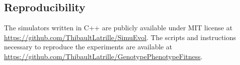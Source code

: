 \documentclass{article}
\begin{document}
\subsection*{Reproducibility}
The simulators written in C++ are publicly available under MIT license at \url{https://github.com/ThibaultLatrille/SimuEvol}.
The scripts and instructions necessary to reproduce the experiments are available at \url{https://github.com/ThibaultLatrille/GenotypePhenotypeFitness}.


\end{document}
